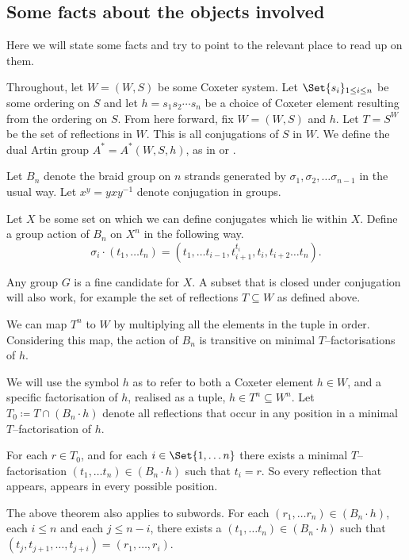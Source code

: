\subsection{Some facts about the objects involved}
Here we will state some facts and try to point to the relevant place to read up on them.

Throughout, let $W = (W,S)$ be some Coxeter system.
Let $\Set\{s_i\}_{1 \leq i \leq n}$ be some ordering on $S$ and let $h = s_1s_2\cdots s_n$ be a choice of Coxeter element resulting from the ordering on $S$.
From here forward, fix $W = (W,S)$ and $h$.
Let $T = S^W$ be the set of reflections in $W$. This is all conjugations of $S$ in $W$.
We define the dual Artin group $A^*  = A^*(W,S,h)$, as in \cite{resteghini_free_2024} or \cite{paolini_salvetti_kpi1_2021}.

Let $B_n$ denote the braid group on $n$ strands generated by $\sigma_1, \sigma_2, \ldots \sigma_{n-1}$ in the usual way.
Let $x^y = y x y^{-1}$ denote conjugation in groups.

\begin{definition}
	Let $X$ be some set on which we can define conjugates which lie within $X$. Define a group action of $B_n$ on $X^n$ in the following way.
	\[
		\sigma_i \cdot  \left( t_1, \ldots t_n \right) = \left( t_1, \ldots t_{i-1}, t_{i+1}^{t_i}, t_{i}, t_{i+2} \ldots t_n \right)
		.\]
	\label{def:braid_action}
\end{definition}
Any group $G$ is a fine candidate for $X$. A subset that is closed under conjugation will also work, for example the set of reflections $T \subseteq W$ as defined above.
\begin{theorem}
	We can map $T^n$ to $W$ by multiplying all the elements in the tuple in order.
	Considering this map, the action of $B_n$ is transitive on minimal $T$--factorisations of $h$.
\end{theorem}
We will use the symbol $h$ as to refer to both a Coxeter element $h \in W$, and a specific factorisation of $h$, realised as a tuple, $h \in T^n \subseteq W^n$. Let $T_0 \coloneqq T \cap (B_n \cdot h)$ denote all reflections that occur in any position in a minimal  $T$--factorisation of $h$.
\begin{theorem}
	For each $ r \in T_0$, and for each $i \in \Set{1, \ldots n} $ there exists a minimal $T$--factorisation $(t_1, \ldots t_n) \in (B_n \cdot h)$ such that $t_i = r$. So every reflection that appears, appears in every possible position.
\end{theorem}
\begin{theorem}
	The above theorem also applies to subwords. For each $(r_1, \ldots r_n) \in (B_n \cdot h)$, each $i \leq n$ and each  $j \leq n-i$, there exists a $(t_1, \ldots t_n) \in (B_n \cdot h)$ such that $(t_j, t_{j+1}, \ldots, t_{j+i}) = (r_1, \ldots, r_i)$.
\end{theorem}

